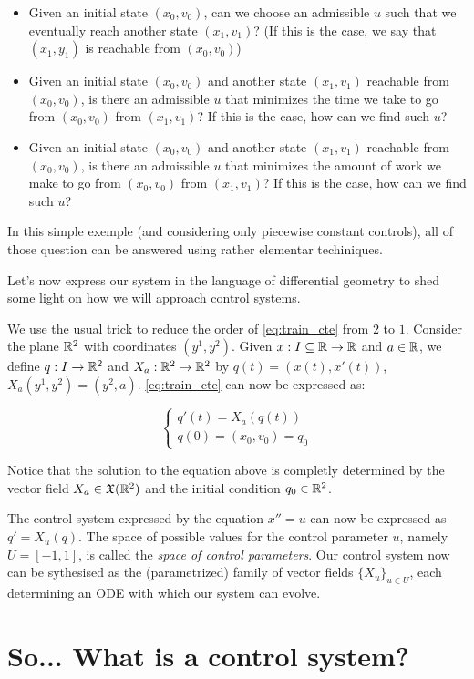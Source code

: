 \begin{itemize}
    \item Given an initial state $(x_0, v_0)$, can we choose an admissible
    $u$ such that we eventually reach
    another state $(x_1, v_1)$? (If this is the case, we say that
    $(x_1, y_1)$ is reachable from $(x_0,v_0)$)

    \item Given an initial state $(x_0, v_0)$ and another state
    $(x_1, v_1)$ reachable from $(x_0,v_0)$,
    is there an admissible $u$ that minimizes
    the time we take to go from $(x_0,v_0)$ from $(x_1,v_1)$?
    If this is the case, how can we find such $u$?

    \item Given an initial state $(x_0, v_0)$ and another state
    $(x_1, v_1)$ reachable from $(x_0,v_0)$,
    is there an admissible $u$ that minimizes
    the amount of work we make to go from $(x_0,v_0)$ from $(x_1,v_1)$?
    If this is the case, how can we find such $u$?

\end{itemize}

In this simple exemple (and considering only piecewise constant controls),
all of those question can be answered using rather elementar
techiniques.

Let's now express our system in the language
of differential geometry to shed some
light on how we will approach control systems. 

We use
the usual trick to reduce the order of \autoref{eq:train_cte}
from $2$ to $1$. Consider the plane $\mathbb{R}^2$ with coordinates
$(y^1,y^2)$. Given $x : I \subseteq \mathbb{R} \to \mathbb{R}$ and $a \in \mathbb{R}$,
we define $q: I \to \mathbb{R}^2$ and $X_a:\mathbb{R}^2 \to \mathbb{R}^2$
by $q(t) = (x(t), x'(t))$, $X_a(y^1,y^2) = (y^2, a)$.
\autoref{eq:train_cte} can now be expressed as:

\begin{equation}
    \label{eq:train_field}
    \begin{cases}
        q'(t) = X_a(q(t))\\
        q(0) = (x_0, v_0) = q_0
    \end{cases}
\end{equation}

Notice that the solution to the equation above is completly determined by the vector
field $X_a \in \mathfrak{X}(\mathbb{R}^2)$ and the initial condition
$q_0 \in \mathbb{R}^2$.

The control system expressed by the equation $x'' = u$
can now be expressed as $q' = X_u(q)$. The space
of possible values for the control parameter $u$, namely $U = [-1,1]$, is called
the \textit{space of control parameters}. Our
control system now can be sythesised as the (parametrized) family
of vector fields $\{X_u\}_{u \in U}$, each determining an ODE with which
our system can evolve.



\section{So... What is a control system?}
